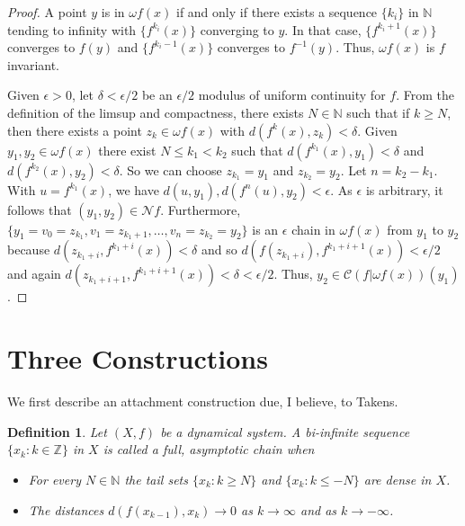 \documentclass[12pt]{amsart}
\newtheorem{df}[theo]{{\bfseries Definition}}
\def \N {\mathbb N}
\def \Z {\mathbb Z}
\def \CC {\mathcal C}
\def \NN {\mathcal N}
\def \ep {\epsilon}
\def \om {\omega}
\def \d {\delta}
\numberwithin{equation}{section}
\begin{document}
\begin{proof} A point $y$ is in $\om f(x)$ if and only if there exists a sequence $\{ k_i \}$ in $\N$ tending to infinity with $\{ f^{k_i}(x) \}$
converging to $y$.  In that case, $\{ f^{k_i+1}(x) \}$ converges to $f(y)$ and  $\{ f^{k_i-1}(x) \}$ converges to $f^{-1}(y)$.
Thus, $\om f(x)$ is $f$ invariant.

Given $\ep > 0$, let $\d < \ep/2$ be an $\ep/2$ modulus of uniform continuity for $f$. From the definition of the limsup and compactness, there exists
$N \in\N$ such that if $k \ge N$, then there exists a point $z_k \in \om f(x)$ with $d(f^k(x),z_k) < \d$. Given $y_1, y_2 \in \om f(x)$
there exist $N \le k_1 < k_2$ such that $d(f^{k_1}(x),y_1) < \d$ and $d(f^{k_2}(x),y_2) < \d$. So we can choose
$z_{k_1} = y_1$ and $z_{k_2} = y_2$. Let $n = k_2 - k_1$. With $u = f^{k_1}(x)$, we have $d(u,y_1), d(f^n(u),y_2) < \ep$. As $\ep$ is arbitrary,
it follows that $(y_1,y_2) \in \NN f$. Furthermore, $\{ y_1 = v_0 = z_{k_1}, v_1 = z_{k_1+1}, \dots, v_n = z_{k_2} = y_2 \} $ is an $\ep$ chain in
$\om f(x)$ from $y_1$ to $y_2$ because $d(z_{k_1+i},f^{k_1+i}(x)) < \d$ and so $d(f(z_{k_1+i}),f^{k_1+i+1}(x)) < \ep/2$ and again
$d(z_{k_1+i+1},f^{k_1+i+1}(x)) < \d < \ep/2$. Thus, $y_2 \in \CC (f|\om f(x))(y_1)$.

\end{proof}\vspace{.25cm}



\section{\textbf{Three Constructions}}\vspace{.5cm}

We first describe an attachment construction  due, I believe,  to Takens.



\begin{df}\label{def1.03} Let $(X,f)$ be a dynamical system. A bi-infinite sequence $\{ x_k : k \in \Z \}$  in $X$ is called a \emph{full, asymptotic
chain} when
\begin{itemize}
\item For every $N \in \N$ the tail sets $\{ x_k : k \ge N \}$ and $\{ x_k : k \le -N \}$ are dense in $X$.

\item The distances $d(f(x_{k-1}),x_k) \to 0$ as $k \to \infty$ and as $k \to -\infty$.
\end{itemize}\end{df}\vspace{.25cm}
\end{document}
